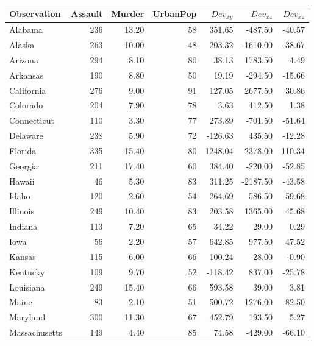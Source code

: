 \documentclass[nohyper,justified]{tufte-handout}\usepackage[]{graphicx}\usepackage[]{color}
\newcommand{\dev}[1] {Dev_{\bar{#1}}}
\begin{document}
\begin{table}[ht]
\centering
\begin{tabular}{lrrrrrr}
  \toprule
Observation & Assault & Murder & UrbanPop & $\dev{xy}$ & ${\dev{xz}}$ & ${\dev{xz}}$ \\ 
  \midrule
Alabama & 236 & 13.20 &  58 & 351.65 & -487.50 & -40.57 \\ 
   \rowcolor[gray]{0.95}Alaska & 263 & 10.00 &  48 & 203.32 & -1610.00 & -38.67 \\ 
  Arizona & 294 & 8.10 &  80 & 38.13 & 1783.50 & 4.49 \\ 
   \rowcolor[gray]{0.95}Arkansas & 190 & 8.80 &  50 & 19.19 & -294.50 & -15.66 \\ 
  California & 276 & 9.00 &  91 & 127.05 & 2677.50 & 30.86 \\ 
   \rowcolor[gray]{0.95}Colorado & 204 & 7.90 &  78 & 3.63 & 412.50 & 1.38 \\ 
  Connecticut & 110 & 3.30 &  77 & 273.89 & -701.50 & -51.64 \\ 
   \rowcolor[gray]{0.95}Delaware & 238 & 5.90 &  72 & -126.63 & 435.50 & -12.28 \\ 
  Florida & 335 & 15.40 &  80 & 1248.04 & 2378.00 & 110.34 \\ 
   \rowcolor[gray]{0.95}Georgia & 211 & 17.40 &  60 & 384.40 & -220.00 & -52.85 \\ 
  Hawaii &  46 & 5.30 &  83 & 311.25 & -2187.50 & -43.58 \\ 
   \rowcolor[gray]{0.95}Idaho & 120 & 2.60 &  54 & 264.69 & 586.50 & 59.68 \\ 
  Illinois & 249 & 10.40 &  83 & 203.58 & 1365.00 & 45.68 \\ 
   \rowcolor[gray]{0.95}Indiana & 113 & 7.20 &  65 & 34.22 & 29.00 & 0.29 \\ 
  Iowa &  56 & 2.20 &  57 & 642.85 & 977.50 & 47.52 \\ 
   \rowcolor[gray]{0.95}Kansas & 115 & 6.00 &  66 & 100.24 & -28.00 & -0.90 \\ 
  Kentucky & 109 & 9.70 &  52 & -118.42 & 837.00 & -25.78 \\ 
   \rowcolor[gray]{0.95}Louisiana & 249 & 15.40 &  66 & 593.58 & 39.00 & 3.81 \\ 
  Maine &  83 & 2.10 &  51 & 500.72 & 1276.00 & 82.50 \\ 
   \rowcolor[gray]{0.95}Maryland & 300 & 11.30 &  67 & 452.79 & 193.50 & 5.27 \\ 
  Massachusetts & 149 & 4.40 &  85 & 74.58 & -429.00 & -66.10 \\ 

\end{tabular}
\end{table}
\end{document}
